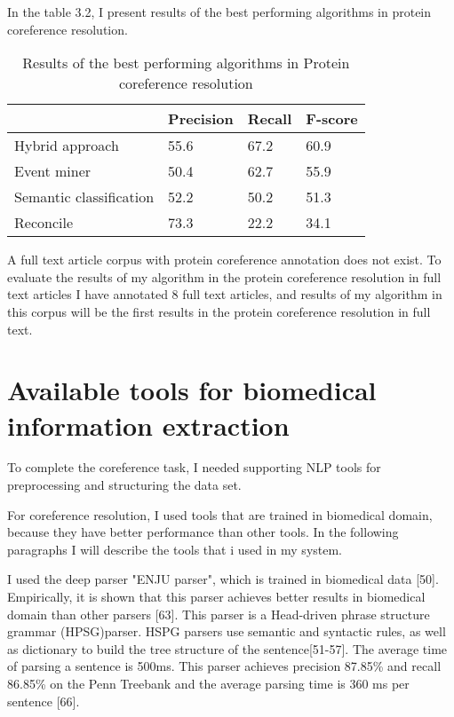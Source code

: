  In the table 3.2, I present results of the best performing algorithms in protein coreference resolution.
\begin{table}[h]
\centering
  \begin{center}
  \centering
 	\begin{tabular}{L{4.2cm} C{2cm} C{2cm} C{2cm}} 
 		
  		& Precision & Recall & F-score \\ [1.1ex] 
 		\hline
 		Hybrid approach & 55.6 & 67.2 & 60.9 \\ [1.1ex] 
 		\hline
 		Event miner & 50.4 & 62.7 & 55.9 \\ [1.1ex] 
 		\hline
 		Semantic classification & 52.2 & 50.2 & 51.3 \\ [1.1ex] 
 		\hline
 		Reconcile & 73.3 & 22.2 & 34.1 \\ [1.1ex] 
 		\hline
	\end{tabular}
  \end{center} 
  \caption{Results of the best performing algorithms in Protein coreference resolution}
  \label{table3.2}
\end{table}

A full text article corpus with protein coreference annotation does not exist. To evaluate the results of my algorithm in the protein coreference resolution in full text articles I have annotated 8 full text articles, and results of my algorithm in this corpus will be the first  results in the protein coreference resolution in full text.
 
\section{Available tools for biomedical information extraction}

To complete the coreference task, I needed supporting NLP tools for preprocessing and structuring the data set.

For coreference resolution, I used tools that are trained in biomedical domain, because they have better performance than other tools. In the following paragraphs I will describe the tools that i used in my system.

I used the deep parser "ENJU parser", which is trained in biomedical data [50]. Empirically, it is shown that this parser achieves better results in biomedical domain than other parsers [63]. This parser is a Head-driven phrase structure grammar (HPSG)parser. HSPG parsers use semantic and syntactic rules, as well as dictionary to build the tree structure of the sentence[51-57]. The average time of parsing a sentence is 500ms. This parser achieves precision 87.85\% and recall 86.85\% on the Penn Treebank and the average parsing time is 360 ms per sentence [66].

